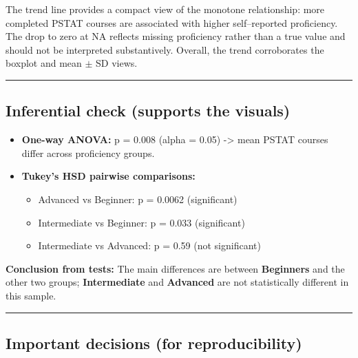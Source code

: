 \documentclass[
  letterpaper,
  DIV=11,
  numbers=noendperiod]{scrartcl}
\providecommand{\tightlist}{%
  \setlength{\itemsep}{0pt}\setlength{\parskip}{0pt}}\usepackage{longtable,booktabs,array}
\begin{document}
The trend line provides a compact view of the monotone relationship:
more completed PSTAT courses are associated with higher self--reported
proficiency. The drop to zero at NA reflects missing proficiency rather
than a true value and should not be interpreted substantively. Overall,
the trend corroborates the boxplot and mean \(\pm\) SD views.

\begin{center}\rule{0.5\linewidth}{0.5pt}\end{center}

\subsection{Inferential check (supports the
visuals)}\label{inferential-check-supports-the-visuals}

\begin{itemize}
\tightlist
\item
  \textbf{One-way ANOVA:} p = 0.008 (alpha = 0.05) -\textgreater{} mean
  PSTAT courses differ across proficiency groups.
\item
  \textbf{Tukey's HSD pairwise comparisons:}

  \begin{itemize}
  \tightlist
  \item
    Advanced vs Beginner: p = 0.0062 (significant)
  \item
    Intermediate vs Beginner: p = 0.033 (significant)
  \item
    Intermediate vs Advanced: p = 0.59 (not significant)
  \end{itemize}
\end{itemize}

\textbf{Conclusion from tests:} The main differences are between
\textbf{Beginners} and the other two groups; \textbf{Intermediate} and
\textbf{Advanced} are not statistically different in this sample.

\begin{center}\rule{0.5\linewidth}{0.5pt}\end{center}

\subsection{Important decisions (for
reproducibility)}\label{important-decisions-for-reproducibility}
\end{document}
